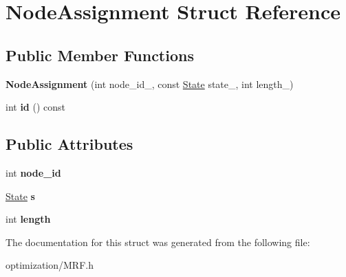 \hypertarget{struct_node_assignment}{
\section{NodeAssignment Struct Reference}
\label{struct_node_assignment}
}
\subsection*{Public Member Functions}
\begin{DoxyCompactItemize}
\item 
\hypertarget{struct_node_assignment_afb4f063136a9da957865d42faa2a3943}{
{\bfseries NodeAssignment} (int node\_\-id\_\-, const \hyperlink{struct_state}{State} state\_\-, int length\_\-)}
\label{struct_node_assignment_afb4f063136a9da957865d42faa2a3943}

\item 
\hypertarget{struct_node_assignment_aea41536d91eba4d9c6440065953aa4e0}{
int {\bfseries id} () const }
\label{struct_node_assignment_aea41536d91eba4d9c6440065953aa4e0}

\end{DoxyCompactItemize}
\subsection*{Public Attributes}
\begin{DoxyCompactItemize}
\item 
\hypertarget{struct_node_assignment_a595045041aa245ed3108284223ce766d}{
int {\bfseries node\_\-id}}
\label{struct_node_assignment_a595045041aa245ed3108284223ce766d}

\item 
\hypertarget{struct_node_assignment_affe9bfbc195ba56f34dcdbd4fb10411e}{
\hyperlink{struct_state}{State} {\bfseries s}}
\label{struct_node_assignment_affe9bfbc195ba56f34dcdbd4fb10411e}

\item 
\hypertarget{struct_node_assignment_ac3b88ac2cbd270733ee835e00279a4ad}{
int {\bfseries length}}
\label{struct_node_assignment_ac3b88ac2cbd270733ee835e00279a4ad}

\end{DoxyCompactItemize}


The documentation for this struct was generated from the following file:\begin{DoxyCompactItemize}
\item 
optimization/MRF.h\end{DoxyCompactItemize}
